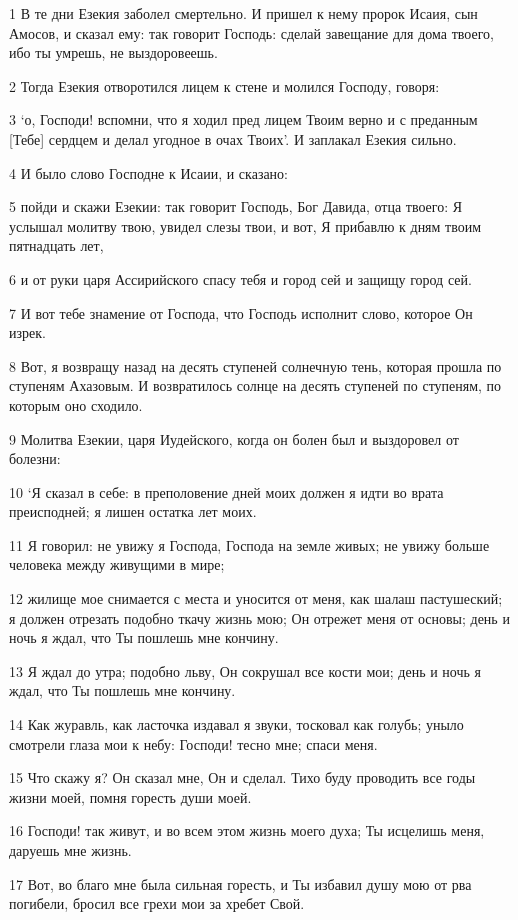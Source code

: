 \par 1 В те дни Езекия заболел смертельно. И пришел к нему пророк Исаия, сын Амосов, и сказал ему: так говорит Господь: сделай завещание для дома твоего, ибо ты умрешь, не выздоровеешь.
\par 2 Тогда Езекия отворотился лицем к стене и молился Господу, говоря:
\par 3 `о, Господи! вспомни, что я ходил пред лицем Твоим верно и с преданным [Тебе] сердцем и делал угодное в очах Твоих'. И заплакал Езекия сильно.
\par 4 И было слово Господне к Исаии, и сказано:
\par 5 пойди и скажи Езекии: так говорит Господь, Бог Давида, отца твоего: Я услышал молитву твою, увидел слезы твои, и вот, Я прибавлю к дням твоим пятнадцать лет,
\par 6 и от руки царя Ассирийского спасу тебя и город сей и защищу город сей.
\par 7 И вот тебе знамение от Господа, что Господь исполнит слово, которое Он изрек.
\par 8 Вот, я возвращу назад на десять ступеней солнечную тень, которая прошла по ступеням Ахазовым. И возвратилось солнце на десять ступеней по ступеням, по которым оно сходило.
\par 9 Молитва Езекии, царя Иудейского, когда он болен был и выздоровел от болезни:
\par 10 `Я сказал в себе: в преполовение дней моих должен я идти во врата преисподней; я лишен остатка лет моих.
\par 11 Я говорил: не увижу я Господа, Господа на земле живых; не увижу больше человека между живущими в мире;
\par 12 жилище мое снимается с места и уносится от меня, как шалаш пастушеский; я должен отрезать подобно ткачу жизнь мою; Он отрежет меня от основы; день и ночь я ждал, что Ты пошлешь мне кончину.
\par 13 Я ждал до утра; подобно льву, Он сокрушал все кости мои; день и ночь я ждал, что Ты пошлешь мне кончину.
\par 14 Как журавль, как ласточка издавал я звуки, тосковал как голубь; уныло смотрели глаза мои к небу: Господи! тесно мне; спаси меня.
\par 15 Что скажу я? Он сказал мне, Он и сделал. Тихо буду проводить все годы жизни моей, помня горесть души моей.
\par 16 Господи! так живут, и во всем этом жизнь моего духа; Ты исцелишь меня, даруешь мне жизнь.
\par 17 Вот, во благо мне была сильная горесть, и Ты избавил душу мою от рва погибели, бросил все грехи мои за хребет Свой.
